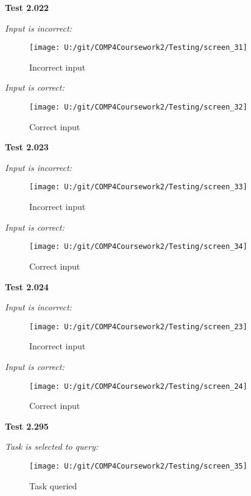 \textbf{Test 2.022}

\textit{Input is incorrect: }

\begin{figure}[H]
    \label{fig: Second Screen}\caption{Incorrect input}
    \texttt{[image: U:/git/COMP4Coursework2/Testing/screen\_31]}
\end{figure}

\textit{Input is correct: }

\begin{figure}[H]
    \label{fig: Second Screen}\caption{Correct input}
    \texttt{[image: U:/git/COMP4Coursework2/Testing/screen\_32]}
\end{figure}

\textbf{Test 2.023}

\textit{Input is incorrect: }

\begin{figure}[H]
    \label{fig: Second Screen}\caption{Incorrect input}
    \texttt{[image: U:/git/COMP4Coursework2/Testing/screen\_33]}
\end{figure}

\textit{Input is correct: }

\begin{figure}[H]
    \label{fig: Second Screen}\caption{Correct input}
    \texttt{[image: U:/git/COMP4Coursework2/Testing/screen\_34]}
\end{figure}

\textbf{Test 2.024}

\textit{Input is incorrect: }

\begin{figure}[H]
    \label{fig: Second Screen}\caption{Incorrect input}
    \texttt{[image: U:/git/COMP4Coursework2/Testing/screen\_23]}
\end{figure}

\textit{Input is correct: }

\begin{figure}[H]
    \label{fig: Second Screen}\caption{Correct input}
    \texttt{[image: U:/git/COMP4Coursework2/Testing/screen\_24]}
\end{figure}

\textbf{Test 2.295}

\textit{Task is selected to query: }

\begin{figure}[H]
    \label{fig: Second Screen}\caption{Task queried}
    \texttt{[image: U:/git/COMP4Coursework2/Testing/screen\_35]}
\end{figure}

